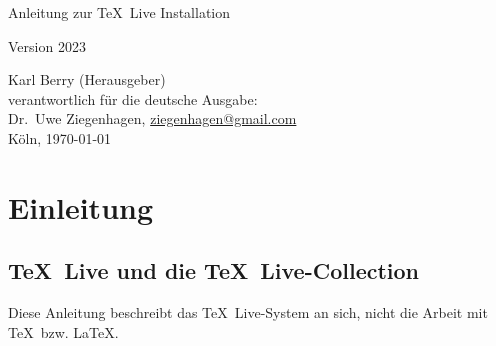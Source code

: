 \documentclass[12pt,ngerman,a4paper,fullparskip]{scrreprt}
\newcommand{\tlcurrentyear}{2023}
\newcommand{\TL}{\TeX\ Live\xspace}
\begin{document}
\begin{titlepage}

\begin{center}
\vspace*{3cm}

 \Huge Anleitung zur \TL Installation \vspace*{1cm}

\Large Version \tlcurrentyear

\end{center}

\vfill \noindent Karl Berry (Herausgeber) \\
verantwortlich für die deutsche Ausgabe:\\ 
Dr.~Uwe Ziegenhagen, \href{mailto:ziegenhagen@gmail.com}{ziegenhagen@gmail.com} \\
Köln, \today
\end{titlepage}


\tableofcontents



\listoffigures



%
%


\chapter{Einleitung}\label{sec:intro}
\section{\TL und die \TL-Collection}

Diese Anleitung beschreibt das \TL-System an sich, nicht die Arbeit mit \TeX\ bzw. \LaTeX. 
\end{document}
